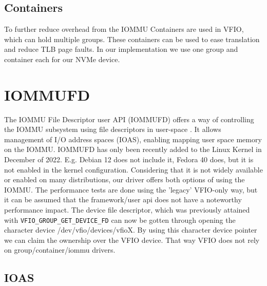 \subsection{Containers}
To further reduce overhead from the IOMMU Containers are used in VFIO, which can hold multiple groups. These containers can be used to ease translation and reduce TLB page faults.
In our implementation we use one group and container each for our NVMe device.

\section{IOMMUFD}
The IOMMU File Descriptor user API (IOMMUFD) offers a way of controlling the IOMMU subsystem using file descriptors in user-space \cite{iommufdkerneldocs}.
It allows management of I/O address spaces (IOAS), enabling mapping user space memory on the IOMMU.
IOMMUFD has only been recently added to the Linux Kernel in December of 2022. E.g. Debian 12 does not include it, Fedora 40 does, but it is not enabled in the kernel configuration. Considering that it is not widely available or enabled on many distributions, our driver offers both options of using the IOMMU. The performance tests are done using the 'legacy' VFIO-only way, but it can be assumed that the framework/user api does not have a noteworthy performance impact.
The device file descriptor, which was previously attained with \texttt{VFIO\_GROUP\_GET\_DEVICE\_FD} can now be gotten through opening the character device /dev/vfio/devices/vfioX.
By using this character device pointer we can claim the ownership over the VFIO device. That way VFIO does not rely on group/container/iommu drivers.

\subsection{IOAS}
